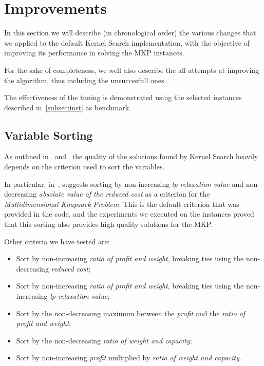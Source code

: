 \chapter{Improvements}\label{ch:improvements}
In this section we will describe (in chronological order) the various changes
that we applied to the default Kernel Search implementation,
with the objective of improving its performance
in solving the MKP instances.

For the sake of completeness, we well also describe the all attempts at improving
the algorithm, thus including the unsuccesfull ones.

The effectiveness of the tuning is demonstrated using the selected instances
described in~\ref{subsec:inst} as benchmark.


\section{Variable Sorting}
As outlined in~\cite{kernel:2010} and~\cite{kernel:2012} the quality of
the solutions found by Kernel Search heavily depends on the criterion used to sort the variables.

In particular, in~\cite{kernel:2010}, suggests
sorting by non-increasing \textit{lp relaxation value} and non-decreasing \textit{absolute value of the reduced cost}
as a criterion for the \textit{Multidimensional Knapsack Problem}.
This is the default criterion that was provided in the code, and
the experiments we executed on the instances proved that this sorting also
provides high quality solutions for the MKP\@.

Other criteria we have tested are:
\begin{itemize}
    \item Sort by non-increasing \textit{ratio of profit and weight},
    breaking ties using the non-decreasing \textit{reduced cost};
    \item Sort by non-increasing \textit{ratio of profit and weight},
    breaking ties using the non-increasing \textit{lp relaxation value};
    \item Sort by the non-decreasing maximum between the \textit{profit}
    and the \textit{ratio of profit and weight};
    \item Sort by the non-decreasing \textit{ratio of weight and capacity};
    \item Sort by non-increasing \textit{profit} multiplied by
    \textit{ratio of weight and capacity}.
\end{itemize}

